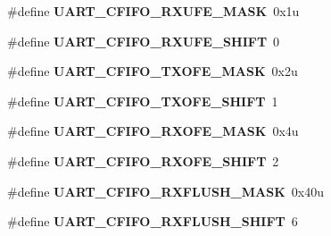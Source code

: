 \begin{DoxyCompactItemize}
\item 
\hypertarget{group___u_a_r_t___register___masks_ga42bfb17cbfc685358f621e71f35225af}{}\#define {\bfseries U\+A\+R\+T\+\_\+\+C\+F\+I\+F\+O\+\_\+\+R\+X\+U\+F\+E\+\_\+\+M\+A\+S\+K}~0x1u\label{group___u_a_r_t___register___masks_ga42bfb17cbfc685358f621e71f35225af}

\item 
\hypertarget{group___u_a_r_t___register___masks_ga9d089a8ed91922d0da34a362a29a2bd5}{}\#define {\bfseries U\+A\+R\+T\+\_\+\+C\+F\+I\+F\+O\+\_\+\+R\+X\+U\+F\+E\+\_\+\+S\+H\+I\+F\+T}~0\label{group___u_a_r_t___register___masks_ga9d089a8ed91922d0da34a362a29a2bd5}

\item 
\hypertarget{group___u_a_r_t___register___masks_gac0d4e861e21453eecfc55ae37c97262d}{}\#define {\bfseries U\+A\+R\+T\+\_\+\+C\+F\+I\+F\+O\+\_\+\+T\+X\+O\+F\+E\+\_\+\+M\+A\+S\+K}~0x2u\label{group___u_a_r_t___register___masks_gac0d4e861e21453eecfc55ae37c97262d}

\item 
\hypertarget{group___u_a_r_t___register___masks_ga10885c0219ee82009a9041c1018e205c}{}\#define {\bfseries U\+A\+R\+T\+\_\+\+C\+F\+I\+F\+O\+\_\+\+T\+X\+O\+F\+E\+\_\+\+S\+H\+I\+F\+T}~1\label{group___u_a_r_t___register___masks_ga10885c0219ee82009a9041c1018e205c}

\item 
\hypertarget{group___u_a_r_t___register___masks_gae389d1934b5154ee403e78e80553e003}{}\#define {\bfseries U\+A\+R\+T\+\_\+\+C\+F\+I\+F\+O\+\_\+\+R\+X\+O\+F\+E\+\_\+\+M\+A\+S\+K}~0x4u\label{group___u_a_r_t___register___masks_gae389d1934b5154ee403e78e80553e003}

\item 
\hypertarget{group___u_a_r_t___register___masks_ga94cc5cf08d8a44d028ec5ea5654d6742}{}\#define {\bfseries U\+A\+R\+T\+\_\+\+C\+F\+I\+F\+O\+\_\+\+R\+X\+O\+F\+E\+\_\+\+S\+H\+I\+F\+T}~2\label{group___u_a_r_t___register___masks_ga94cc5cf08d8a44d028ec5ea5654d6742}

\item 
\hypertarget{group___u_a_r_t___register___masks_ga220d54d00fd7f64a3c31a9b593e4ffed}{}\#define {\bfseries U\+A\+R\+T\+\_\+\+C\+F\+I\+F\+O\+\_\+\+R\+X\+F\+L\+U\+S\+H\+\_\+\+M\+A\+S\+K}~0x40u\label{group___u_a_r_t___register___masks_ga220d54d00fd7f64a3c31a9b593e4ffed}

\item 
\hypertarget{group___u_a_r_t___register___masks_gaa2254c7b026117f42b36539b526aca46}{}\#define {\bfseries U\+A\+R\+T\+\_\+\+C\+F\+I\+F\+O\+\_\+\+R\+X\+F\+L\+U\+S\+H\+\_\+\+S\+H\+I\+F\+T}~6\label{group___u_a_r_t___register___masks_gaa2254c7b026117f42b36539b526aca46}


\end{DoxyCompactItemize}
